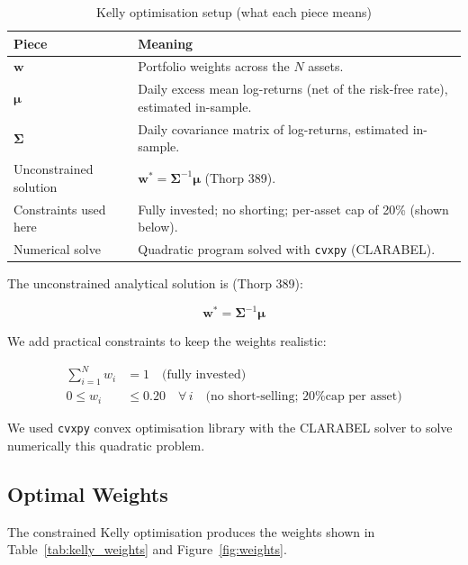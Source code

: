 \documentclass[11pt,a4paper]{article}
\begin{document}
\begin{table}[H]
\centering
\caption{Kelly optimisation setup (what each piece means)}
\label{tab:kelly_setup}
{\small\setlength{\tabcolsep}{4pt}\renewcommand{\arraystretch}{1.15}\begin{tabularx}{\textwidth}{>{\raggedright\arraybackslash}p{3.2cm} X}
\toprule
Piece & Meaning \\
\midrule
$\bm{w}$ & Portfolio weights across the $N$ assets. \\
$\bm{\mu}$ & Daily excess mean log-returns (net of the risk-free rate), estimated in-sample. \\
$\bm{\Sigma}$ & Daily covariance matrix of log-returns, estimated in-sample. \\
Unconstrained solution & $\bm{w}^* = \bm{\Sigma}^{-1}\bm{\mu}$ (Thorp 389). \\
Constraints used here & Fully invested; no shorting; per-asset cap of 20\% (shown below). \\
Numerical solve & Quadratic program solved with \texttt{cvxpy} (CLARABEL). \\
\bottomrule
\end{tabularx}}
\end{table}

The unconstrained analytical solution is (Thorp 389):

\[
\bm{w}^* = \bm{\Sigma}^{-1} \bm{\mu}
\]

We add practical constraints to keep the weights realistic:

\begin{align*}
    \sum_{i=1}^{N} w_i &= 1 \quad \text{(fully invested)} \\
    0 \leq w_i &\leq 0.20 \quad \forall\, i \quad \text{(no short-selling; 20\% cap per asset)}
\end{align*}

We used
\texttt{cvxpy} convex optimisation library with the CLARABEL solver to solve numerically this quadratic problem.

\subsection{Optimal Weights}

The constrained Kelly optimisation produces the weights shown in
Table~\ref{tab:kelly_weights} and Figure~\ref{fig:weights}.
\end{document}
